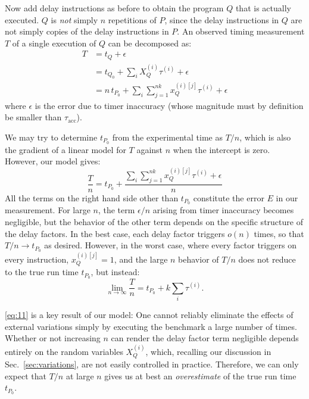 \documentclass[conference]{IEEEtran}
\begin{document}
Now add delay instructions as before to obtain the program $Q$ that is actually
executed. $Q$ is \textit{not} simply $n$ repetitions of $P$, since the delay
instructions in $Q$ are not simply copies of the delay instructions in $P$.
An observed timing measurement $T$ of a single execution of $Q$ can be
decomposed as:
%
\begin{align}
    T &= t_{Q} + \epsilon \\ \nonumber
      &= t_{Q_0} + \sum_{i} X_Q^{(i)} \tau^{(i)} + \epsilon \\ \nonumber
      &= n \, t_{P_0} + \sum_{i} \sum_{j=1}^{nk} x_Q^{(i)[j]} \tau^{(i)} + \epsilon
\end{align}
%
where $\epsilon$ is the error due to timer inaccuracy (whose magnitude must by definition be smaller than $\tau_\textrm{acc}$).

We may try to determine $t_{P_0}$ from the experimental time as $T/n$, which is
also the gradient of a linear model for $T$ against $n$ when the intercept is
zero. However, our model gives:
%
\vspace{-0.10cm}
\begin{equation}
    \frac{T}{n} = t_{P_0} + \frac{\sum_{i} \sum_{j=1}^{nk} x_Q^{(i)[j]} \tau^{(i)} + \epsilon}{n}
\end{equation}
%
All the terms on the right hand side other than $t_{P_0}$ constitute the
error $E$ in our measurement. For large $n$, the term $\epsilon/n$ arising from
timer inaccuracy becomes negligible, but the behavior of the other term depends
on the specific structure of the delay factors. In the best case, each delay
factor triggers $o(n)$ times, so that $T/n\to t_{P_0}$ as desired. However, in
the worst case, where every factor triggers on every instruction, $x_Q^{(i)[j]}
= 1$, and the large $n$ behavior of $T/n$ does not reduce to the true run time
$t_{P_0}$, but instead:
%
\begin{equation}
\label{eq:11}
    \lim_{n\to\infty} \frac{T}{n} = t_{P_0} + k \sum_{i} \tau^{(i)}.
\end{equation}

\eqref{eq:11} is a key result of our model: One cannot reliably eliminate the
effects of external variations simply by executing the benchmark a large number
of times.  Whether or not increasing $n$ can render the delay factor term
negligible depends entirely on the random variables $X_Q^{(i)}$, which,
recalling our discussion in Sec.~\ref{sec:variations}, are not easily
controlled in practice. Therefore, we can only expect that $T/n$ at large $n$
gives us at best an \textit{overestimate} of the true run time $t_{P_0}$.
\end{document}
